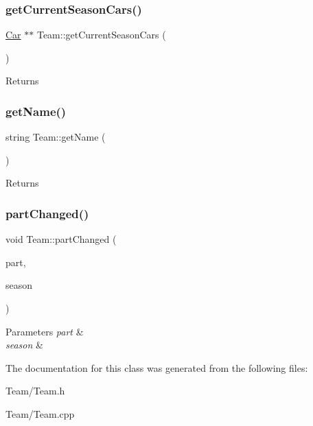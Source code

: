 \subsubsection{\texorpdfstring{get\+Current\+Season\+Cars()}{getCurrentSeasonCars()}}
{\footnotesize\ttfamily \hyperlink{classCar}{Car} $\ast$$\ast$ Team\+::get\+Current\+Season\+Cars (\begin{DoxyParamCaption}{ }\end{DoxyParamCaption})}

\begin{DoxyReturn}{Returns}

\end{DoxyReturn}
\mbox{\label{classTeam_ab21736a411213da36d08210e570ecbeb}} 
\subsubsection{\texorpdfstring{get\+Name()}{getName()}}
{\footnotesize\ttfamily string Team\+::get\+Name (\begin{DoxyParamCaption}{ }\end{DoxyParamCaption})}

\begin{DoxyReturn}{Returns}

\end{DoxyReturn}
\mbox{\label{classTeam_add32843daa734d808b93e5a9793b158a}} 
\subsubsection{\texorpdfstring{part\+Changed()}{partChanged()}}
{\footnotesize\ttfamily void Team\+::part\+Changed (\begin{DoxyParamCaption}\item[{\hyperlink{classDepartmentOutput}{Department\+Output} $\ast$}]{part,  }\item[{string}]{season }\end{DoxyParamCaption})}


\begin{DoxyParams}{Parameters}
{\em part} & \\
\hline
{\em season} & \\
\hline
\end{DoxyParams}


The documentation for this class was generated from the following files\+:\begin{DoxyCompactItemize}
\item 
Team/Team.\+h\item 
Team/Team.\+cpp\end{DoxyCompactItemize}

